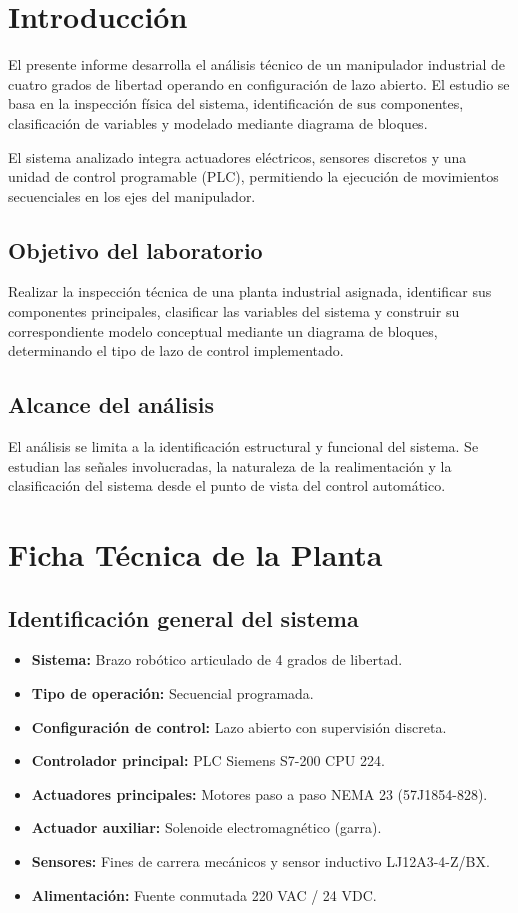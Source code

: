 \documentclass[a4paper,12pt]{article}
\begin{document}
\tableofcontents
\newpage

\section{Introducción}
El presente informe desarrolla el análisis técnico de un manipulador industrial de cuatro grados de libertad operando en configuración de lazo abierto. El estudio se basa en la inspección física del sistema, identificación de sus componentes, clasificación de variables y modelado mediante diagrama de bloques.

El sistema analizado integra actuadores eléctricos, sensores discretos y una unidad de control programable (PLC), permitiendo la ejecución de movimientos secuenciales en los ejes del manipulador.
\subsection{Objetivo del laboratorio}
Realizar la inspección técnica de una planta industrial asignada, identificar sus componentes principales, clasificar las variables del sistema y construir su correspondiente modelo conceptual mediante un diagrama de bloques, determinando el tipo de lazo de control implementado.
\subsection{Alcance del análisis}

El análisis se limita a la identificación estructural y funcional del sistema. Se estudian las señales involucradas, la naturaleza de la realimentación y la clasificación del sistema desde el punto de vista del control automático.
\section{Ficha Técnica de la Planta}
\subsection{Identificación general del sistema}

\begin{itemize}
\item \textbf{Sistema:} Brazo robótico articulado de 4 grados de libertad.
\item \textbf{Tipo de operación:} Secuencial programada.
\item \textbf{Configuración de control:} Lazo abierto con supervisión discreta.
\item \textbf{Controlador principal:} PLC Siemens S7-200 CPU 224.
\item \textbf{Actuadores principales:} Motores paso a paso NEMA 23 (57J1854-828).
\item \textbf{Actuador auxiliar:} Solenoide electromagnético (garra).
\item \textbf{Sensores:} Fines de carrera mecánicos y sensor inductivo LJ12A3-4-Z/BX.
\item \textbf{Alimentación:} Fuente conmutada 220 VAC / 24 VDC.
\end{itemize}
\end{document}
